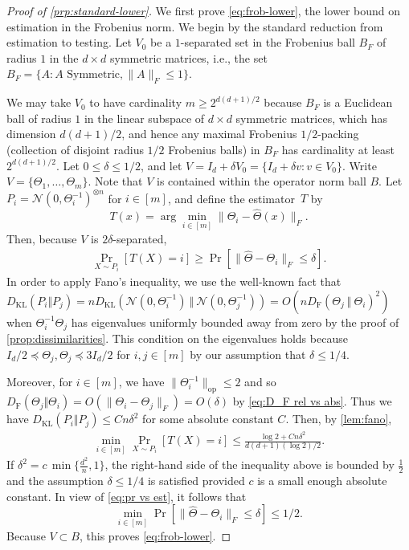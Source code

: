\documentclass[aos]{imsart}
\theoremstyle{definition}
\numberwithin{equation}{section}
\DeclareMathOperator{\op}{op}
\newcommand{\htheta}{\widehat{\Theta}}
\newcommand{\ot}{\otimes}
\newcommand{\DF}{D_{\operatorname{F}}}
\newcommand{\DKL}{D_{\operatorname{KL}}}
\begin{document}
\begin{proof}[Proof of \cref{prp:standard-lower}]
We first prove \cref{eq:frob-lower}, the lower bound on estimation in the Frobenius norm.
We begin by the standard reduction from estimation to testing.
Let $V_0$ be a $1$-separated set in the Frobenius ball $B_F$ of radius $1$ in the $d\times d$ symmetric matrices, i.e., the set $B_F = \{A: A \text{ Symmetric}, \|A\|_F \leq 1\}$.

We may take $V_0$ to have cardinality $m \geq 2^{d(d+1)/2}$ because $B_F$ is a Euclidean ball of radius $1$ in the linear subspace of $d\times d$ symmetric matrices, which has dimension $d(d+1)/2$, and hence any maximal Frobenius $1/2$-packing (collection of disjoint radius $1/2$ Frobenius balls) in $B_F$ has cardinality at least $2^{d(d+1)/2}$.
Let $0 \leq \delta \leq 1/2$, and let $V = I_d + \delta V_0 = \{I_d + \delta v: v \in V_0\}$.
Write $V = \{\Theta_1, \dots, \Theta_m\}$.
Note that $V$ is contained within the operator norm ball $B$.
Let $P_i =\mathcal{N}(0, \Theta^{-1}_i)^{\ot n}$ for $i\in[m]$, and define the estimator~$T$ by
\[ T(x) = \arg\min_{i \in [m]} \|\Theta_i - \htheta(x)\|_F. \]
Then, because $V$ is $2\delta$-separated,
\begin{align}\label{eq:pr vs est}
  \Pr_{X \sim P_i} \left[T(X) = i\right] \geq \Pr\left[\|\htheta -  \Theta_i\|_F \leq \delta\right].
\end{align}
In order to apply Fano's inequality, we use the well-known fact that $\DKL(P_i\Vert  P_j) = n \DKL(\mathcal{N}(0, \Theta_i^{-1})\ \Vert  \ \mathcal{N}(0, \Theta_j^{-1})) = O(n\DF(\Theta_j \ \Vert  \ \Theta_i)^2)$ when $\Theta_i^{-1}\Theta_j$ has eigenvalues uniformly bounded away from zero by the proof of \cref{prop:dissimilarities}.
This condition on the eigenvalues holds because $I_d/2 \preceq \Theta_j, \Theta_j \preceq 3I_d/2$ for $i,j \in [m]$ by our assumption that $\delta \leq 1/4$.

Moreover, for $i \in [m]$, we have $\|\Theta_i^{-1}\|_{\op} \leq 2$ and so $\DF(\Theta_j\Vert  \Theta_i) = O( \|\Theta_i - \Theta_j\|_F) = O(\delta)$ by \cref{eq:D_F rel vs abs}.
Thus we have $\DKL(P_i\Vert  P_j) \leq Cn \delta^2$ for some absolute constant $C$.
Then, by \cref{lem:fano},
\begin{align*}
  \min_{i \in [m]} \Pr_{X \sim P_i}[T(X) = i] \leq \frac{  \log 2 + C n \delta^2}{d(d+1)(\log 2)/2 }.
\end{align*}
If $\delta^2 = c \, \min\{ \frac{d^2}{n}, 1\}$, the right-hand side of the inequality above is bounded by $\frac{1}{2}$ and the assumption $\delta \leq 1/4$ is satisfied provided $c$ is a small enough absolute constant.
In view of \cref{eq:pr vs est}, it follows that
\[ \min_{i \in [m]} \Pr\left[ \|\htheta - \Theta_i\|_F \leq \delta\right] \leq 1/2. \]
Because $V \subset B$, this proves \cref{eq:frob-lower}.


\end{proof}
\end{document}
